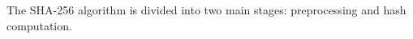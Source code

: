 The SHA-256 algorithm \cite{SHA_NIST_FIPS} is divided into two main stages: 
preprocessing and hash computation.
